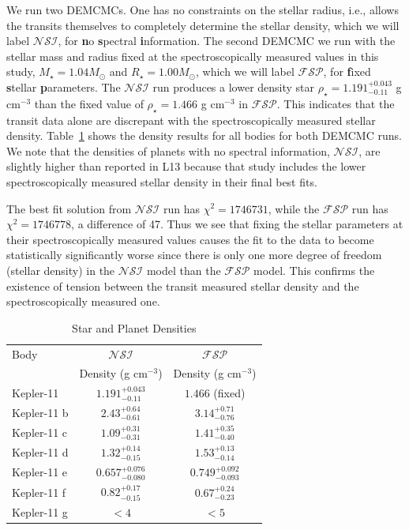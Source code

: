 \documentclass[oneside]{emulateapj}
\begin{document}
We run two DEMCMCs. One has no constraints on the stellar radius, i.e., allows the transits themselves to completely determine the stellar density, which we will label $\mathcal{NSI}$, for {\bf n}o {\bf s}pectral {\bf i}nformation. The second DEMCMC we run with the stellar mass and radius fixed at the spectroscopically measured values in this study, $M_\star=1.04M_\odot$ and $R_\star=1.00M_\odot$, which we will label $\mathcal{FSP}$, for {\bf f}ixed {\bf s}tellar {\bf p}arameters. The $\mathcal{NSI}$ run produces a lower density star $\rho_\star = 1.191^{+0.043}_{-0.11}$ g cm$^{-3}$ than the fixed value of $\rho_\star = 1.466$ g cm$^{-3}$ in $\mathcal{FSP}$. This indicates that the transit data alone are discrepant with the spectroscopically measured stellar density. Table~\ref{table:den} shows the density results for all bodies for both DEMCMC runs. We note that the densities of planets with no spectral information, $\mathcal{NSI}$, are slightly higher than reported in L13 because that study includes the lower spectroscopically measured stellar density in their final best fits.

The best fit solution from $\mathcal{NSI}$ run has $\chi^2 = 1746731$, while the $\mathcal{FSP}$ run has $\chi^2 = 1746778$, a difference of 47. Thus we see that fixing the stellar parameters at their spectroscopically measured values causes the fit to the \Kepler data to become statistically significantly worse since there is only one more degree of freedom (stellar density) in the $\mathcal{NSI}$ model than the $\mathcal{FSP}$ model. This confirms the existence of tension between the transit measured stellar density and the spectroscopically measured one.  

\begin{table}
\caption{Star and Planet Densities}
\label{table:den}
\centering 
\begin{tabular}{l c c} 
\hline
Body & $\mathcal{NSI}$ & $\mathcal{FSP}$  \\
 & Density (g cm$^{-3}$)  & Density (g cm$^{-3}$) \\
\hline
Kepler-11    & $1.191^{+0.043}_{-0.11} $& $1.466 $ (fixed) \\
Kepler-11 b & $2.43^{+0.64}_{-0.61} $ & $ 3.14^{+0.71}_{-0.76} $  \\
Kepler-11 c &  $ 1.09^{+0.31}_{-0.31} $ &$ 1.41^{+0.35}_{-0.40} $ \\
Kepler-11 d &  $ 1.32^{+0.14}_{-0.15} $ & $ 1.53^{+0.13}_{-0.14} $ \\
Kepler-11 e &  $ 0.657^{+0.076}_{-0.080} $ & $ 0.749^{+0.092}_{-0.093} $ \\
Kepler-11 f &  $ 0.82^{+0.17}_{-0.15} $  &$ 0.67^{+0.24}_{-0.23} $  \\
Kepler-11 g &  $ <  4 $ & $ < 5 $\\
\hline       
\end{tabular}

\end{table}
\end{document}
